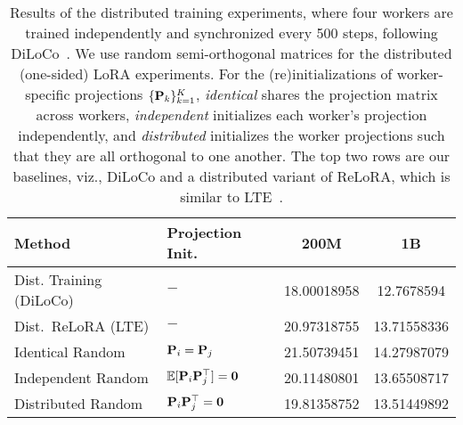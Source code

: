 \begin{table}[t]
\footnotesize
\centering
\begin{tabular}{llSS}
\toprule
Method & Projection Init.   &                                    {200M}      & {1B}        \\ \midrule
Dist. Training (DiLoCo) & $-$                                     & 18.00018958 & 12.7678594  \\ 
Dist.\ ReLoRA (LTE) & $-$                                     & 20.97318755 &  13.71558336 \\ 
 \midrule
Identical Random   & ${\mathbf{P}}_i = {\mathbf{P}}_j$ & 21.50739451 & 14.27987079 \\
Independent Random   & $\operatorname{\mathbb{E}}[ {\mathbf{P}}_i {\mathbf{P}}_j^\top] = \mathbf{0}$ & 20.11480801 & 13.65508717 \\
Distributed Random & ${\mathbf{P}}_i  {\mathbf{P}}_j^\top = \mathbf{0}$  & 19.81358752 & 13.51449892 \\
\bottomrule
\end{tabular}
\vcram{-2mm}
\caption{Results of the distributed training experiments, where four workers are trained independently and synchronized every 500 steps, following DiLoCo~\citep{diloco}. We use random semi-orthogonal matrices for the distributed (one-sided) LoRA experiments. For the (re)initializations of worker-specific projections $\{{\mathbf{P}}_k\}_{k=1}^K$, \emph{identical} shares the projection matrix across workers, \emph{independent} initializes each worker's projection independently, and \emph{distributed} initializes the worker projections such that they are all orthogonal to one another. The top two rows are our baselines, viz., DiLoCo and a distributed variant of ReLoRA, which is similar to LTE~\citep{lte}.}
\vcram{-7mm}
\label{tab:result-distributed}
\end{table}
